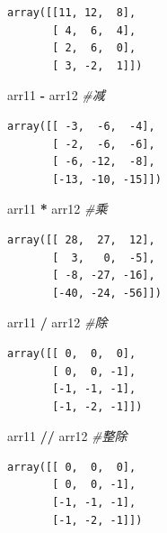 \documentclass[]{article}
\newenvironment{Shaded}{\begin{snugshade}}{\end{snugshade}}
\newcommand{\CommentTok}[1]{\textcolor[rgb]{0.56,0.35,0.01}{\textit{#1}}}
\newcommand{\OperatorTok}[1]{\textcolor[rgb]{0.81,0.36,0.00}{\textbf{#1}}}
\newcommand{\NormalTok}[1]{#1}
\begin{document}
\begin{verbatim}
array([[11, 12,  8],
       [ 4,  6,  4],
       [ 2,  6,  0],
       [ 3, -2,  1]])
\end{verbatim}

\begin{Shaded}
\begin{Highlighting}[]
\NormalTok{arr11 }\OperatorTok{-}\NormalTok{ arr12 }\CommentTok{#减}
\end{Highlighting}
\end{Shaded}

\begin{verbatim}
array([[ -3,  -6,  -4],
       [ -2,  -6,  -6],
       [ -6, -12,  -8],
       [-13, -10, -15]])
\end{verbatim}

\begin{Shaded}
\begin{Highlighting}[]
\NormalTok{arr11 }\OperatorTok{*}\NormalTok{ arr12 }\CommentTok{#乘}
\end{Highlighting}
\end{Shaded}

\begin{verbatim}
array([[ 28,  27,  12],
       [  3,   0,  -5],
       [ -8, -27, -16],
       [-40, -24, -56]])
\end{verbatim}

\begin{Shaded}
\begin{Highlighting}[]
\NormalTok{arr11 }\OperatorTok{/}\NormalTok{ arr12 }\CommentTok{#除}
\end{Highlighting}
\end{Shaded}

\begin{verbatim}
array([[ 0,  0,  0],
       [ 0,  0, -1],
       [-1, -1, -1],
       [-1, -2, -1]])
\end{verbatim}

\begin{Shaded}
\begin{Highlighting}[]
\NormalTok{arr11 }\OperatorTok{//}\NormalTok{ arr12 }\CommentTok{#整除}
\end{Highlighting}
\end{Shaded}

\begin{verbatim}
array([[ 0,  0,  0],
       [ 0,  0, -1],
       [-1, -1, -1],
       [-1, -2, -1]])
\end{verbatim}

\begin{Shaded}
\end{Shaded}
\end{document}
